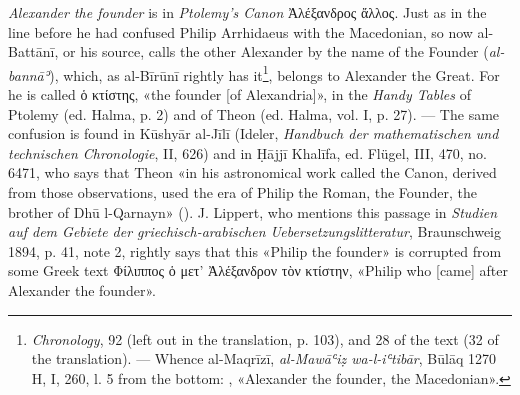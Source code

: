 \documentclass[11pt]{article}
\begin{document}
\par \emph{Alexander the founder} is in \emph{Ptolemy's Canon} {\greekfont Ἀλέξανδρος ἄλλος}. Just as in the line before he had confused Philip Arrhidaeus with the Macedonian, so now al-Battānī, or his source, calls the other Alexander by the name of the Founder (\emph{al-bannāʾ}), which, as al-Bīrūnī rightly has it\footnote{\emph{Chronology}, 92 (left out in the translation, p. 103), and 28 of the text (32 of the translation). — Whence al-Maqrīzī, \emph{al-Mawāʿiẓ wa-l-iʿtibār}, Būlāq 1270 H, I, 260, l. 5 from the bottom: , «Alexander the founder, the Macedonian».}, belongs to Alexander the Great. For he is called {\greekfont ὁ κτίστης}, «the founder [of Alexandria]», in the \emph{Handy Tables} of Ptolemy (ed. Halma, p. 2) and of Theon (ed. Halma, vol. I, p. 27). — The same confusion is found in Kūshyār al-Jīlī (Ideler, \emph{Handbuch der mathematischen und technischen Chronologie}, II, 626) and in Ḥājjī Khalīfa, ed. Flügel, III, 470, no. 6471, who says that Theon «in his astronomical work called the Canon, derived from those observations, used the era of Philip the Roman, the Founder, the brother of Dhū l-Qarnayn» (). J. Lippert, who mentions this passage in \emph{Studien auf dem Gebiete der griechisch-arabischen Uebersetzungslitteratur}, Braunschweig 1894, p. 41, note 2, rightly says that this «Philip the founder» is corrupted from some Greek text {\greekfont Φίλιππος ὁ μετ’ Ἀλέξανδρον τὸν κτίστην}, «Philip who [came] after Alexander the founder».\par
\end{document}
